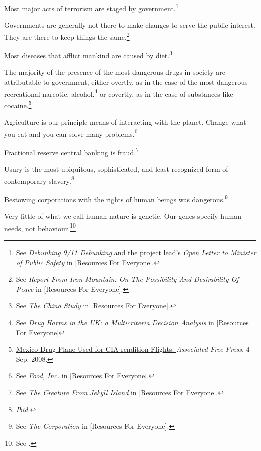 \item
Most major acts of terrorism are staged by government.\footnote{See {\it Debunking 9/11 Debunking} and the project lead's {\it Open Letter to Minister of Public Safety} in [Resources For Everyone].}

\item
Governments are generally not there to make changes to serve the public interest. They are there to keep things the same.\footnote{See {\it Report From Iron Mountain: On The Possibility And Desirability Of Peace} in [Resources For Everyone].}

\item
Most diseases that afflict mankind are caused by diet.\footnote{See {\it The China Study} in [Resources For Everyone].}

\item
The majority of the presence of the most dangerous drugs in society are attributable to government, either overtly, as in the case of the most dangerous recreational narcotic, alcohol,\footnote{See {\it Drug Harms in the UK: a Multicriteria Decision Analysis} in [Resources For Everyone]} or covertly, as in the case of substances like cocaine.\footnote{\href{http://afp.google.com/article/ALeqM5j6QonBKKMo2gw1e3ql-xUcQEZbVg}{Mexico Drug Plane Used for CIA rendition Flights. }{\it Associated Free Press}. 4 Sep. 2008.}

\item
Agriculture is our principle means of interacting with the planet. Change what you eat and you can solve many problems.\footnote{See {\it Food, Inc.} in [Resources For Everyone].}

\item
Fractional reserve central banking is fraud.\footnote{See {\it The Creature From Jekyll Island} in [Resources For Everyone].}

\item
Usury is the most ubiquitous, sophisticated, and least recognized form of contemporary slavery.\footnote{{\it Ibid.}}

\item
Bestowing corporations with the rights of human beings was dangerous.\footnote{See {\it The Corporation} in [Resources For Everyone].}

\item
Very little of what we call human nature is genetic. Our genes specify human needs, not behaviour.\footnote{See .}

